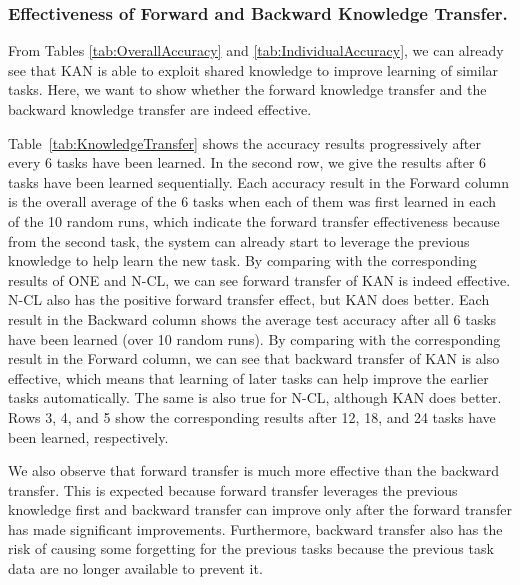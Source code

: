 \documentclass[runningheads]{llncs}
\begin{document}
\subsubsection{Effectiveness of Forward and Backward Knowledge Transfer.} 
{\color{black}From Tables \ref{tab:OverallAccuracy} and \ref{tab:IndividualAccuracy}, we can already see that KAN is able to exploit shared knowledge to improve learning of similar tasks. Here, we want to show whether the forward knowledge transfer and the backward knowledge transfer are indeed effective. 

Table~\ref{tab:KnowledgeTransfer} shows the accuracy results progressively after every 6 tasks have been learned. In the second row, we give the results after 6 tasks have been learned sequentially. Each accuracy result in the Forward column is the overall average of the 6 tasks when each of them was first learned in each of the 10 random runs, which indicate the forward transfer effectiveness because from the second task, the system can already start to leverage the previous knowledge to help learn the new task. By comparing with the corresponding results of ONE {\color{black}and N-CL}, we can see forward transfer of KAN is indeed effective. N-CL also has the positive forward transfer effect, but KAN does better. Each result in the Backward column shows the average test accuracy after all 6 tasks have been learned (over 10 random runs). By comparing with the corresponding result in the Forward column, we can see that backward transfer of KAN is also effective, which means that learning of later tasks can help improve the earlier tasks automatically. The same is also true for N-CL, although KAN does better. Rows 3, 4, and 5 show the corresponding results after 12, 18, and 24 tasks have been learned, respectively. 

We also observe that forward transfer is much more effective than the backward transfer. This is expected because forward transfer leverages the previous knowledge first and backward transfer can improve only after the forward transfer has made significant improvements. Furthermore, backward transfer also has the risk of causing some forgetting for the previous tasks because the previous task data are no longer available to prevent it. }
\end{document}
